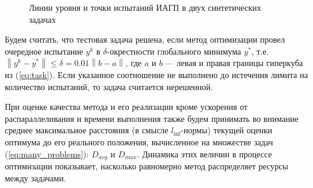 \documentclass{cmi}
\begin{document}
\begin{figure}[ht]
    \centering
    \caption{Линии уровня и точки испытаний ИАГП в двух синтетических задачах}
    \label{fig:isolines}
\end{figure}

Будем считать, что тестовая задача решена, если метод оптимизации провел очередное испытание \(y^k\) в
\(\delta\)-окрестности глобального минимума \(y^*\), т.е. $\left\|y^k-
y^*\right\|\leqslant \delta = 0.01\left\|b-a\right\|$, где \(a\) и \(b\) --- левая и правая границы гиперкуба из (\ref{eq:task}).
Если указанное соотношение не выполнено до истечения лимита на количество испытаний, то задача считается нерешенной.

При оценке качества метода и его реализации кроме ускорения от распараллеливания и времени выполнения также будем принимать во внимание среднее максимальное расстояния (в смысле \(l_{\inf}\)-нормы) текущей оценки оптимума до его реального положения,
вычисленное на множестве задач (\ref{eq:many_problems}): \(D_{avg}\) и \(D_{max}\). Динамика этих величин в процессе оптимизации
показывает, насколько равномерно метод распределяет ресурсы между задачами.
\end{document}
